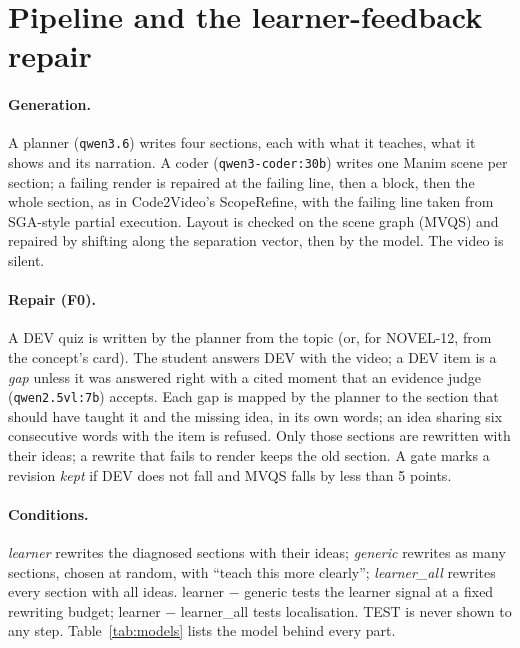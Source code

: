 \section{Pipeline and the learner-feedback repair}\label{sec:pipeline}


\paragraph{Generation.} A planner (\texttt{qwen3.6}) writes four sections, each with what it teaches, what it shows and
its narration. A coder (\texttt{qwen3-coder:30b}) writes one Manim scene per section; a failing render is repaired at
the failing line, then a block, then the whole section, as in Code2Video's ScopeRefine, with the failing line taken
from SGA-style partial execution. Layout is checked on the scene graph (MVQS) and repaired by shifting along the
separation vector, then by the model. The video is silent.

\paragraph{Repair (F0).} A DEV quiz is written by the planner from the topic (or, for NOVEL-12, from the concept's
card). The student answers DEV with the video; a DEV item is a \emph{gap} unless it was answered right with a cited
moment that an evidence judge (\texttt{qwen2.5vl:7b}) accepts. Each gap is mapped by the planner to the section that
should have taught it and the missing idea, in its own words; an idea sharing six consecutive words with the item is
refused. Only those sections are rewritten with their ideas; a rewrite that fails to render keeps the old section. A
gate marks a revision \emph{kept} if DEV does not fall and MVQS falls by less than 5 points.

\paragraph{Conditions.} \emph{learner} rewrites the diagnosed sections with their ideas; \emph{generic} rewrites as
many sections, chosen at random, with ``teach this more clearly''; \emph{learner\_all} rewrites every section with all
ideas. learner $-$ generic tests the learner signal at a fixed rewriting budget; learner $-$ learner\_all tests
localisation. TEST is never shown to any step. Table~\ref{tab:models} lists the model behind every part.


